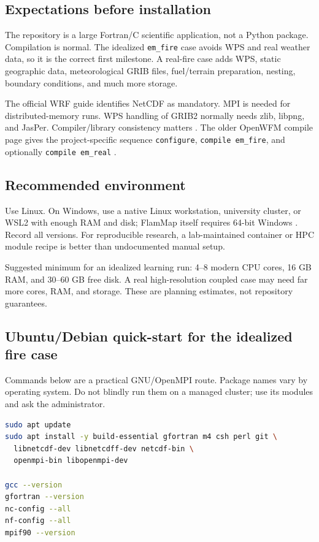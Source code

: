 \documentclass[11pt]{article}
\begin{document}
\subsection{Expectations before installation}

The repository is a large Fortran/C scientific application, not a Python package. Compilation is normal. The idealized \texttt{em\_fire} case avoids WPS and real weather data, so it is the correct first milestone. A real-fire case adds WPS, static geographic data, meteorological GRIB files, fuel/terrain preparation, nesting, boundary conditions, and much more storage.

The official WRF guide identifies NetCDF as mandatory. MPI is needed for distributed-memory runs. WPS handling of GRIB2 normally needs zlib, libpng, and JasPer. Compiler/library consistency matters \cite{wrfCompile}. The older OpenWFM compile page gives the project-specific sequence \texttt{configure}, \texttt{compile em\_fire}, and optionally \texttt{compile em\_real} \cite{openwfmCompile}.

\subsection{Recommended environment}

Use Linux. On Windows, use a native Linux workstation, university cluster, or WSL2 with enough RAM and disk; FlamMap itself requires 64-bit Windows \cite{flammap}. Record all versions. For reproducible research, a lab-maintained container or HPC module recipe is better than undocumented manual setup.

Suggested minimum for an idealized learning run: 4--8 modern CPU cores, 16 GB RAM, and 30--60 GB free disk. A real high-resolution coupled case may need far more cores, RAM, and storage. These are planning estimates, not repository guarantees.

\subsection{Ubuntu/Debian quick-start for the idealized fire case}

Commands below are a practical GNU/OpenMPI route. Package names vary by operating system. Do not blindly run them on a managed cluster; use its modules and ask the administrator.

\begin{lstlisting}[language=bash,caption={Install a consistent GNU toolchain and common dependencies}]
sudo apt update
sudo apt install -y build-essential gfortran m4 csh perl git \
  libnetcdf-dev libnetcdff-dev netcdf-bin \
  openmpi-bin libopenmpi-dev

gcc --version
gfortran --version
nc-config --all
nf-config --all
mpif90 --version
\end{lstlisting}
\end{document}
